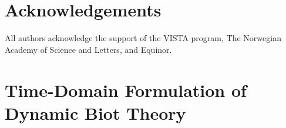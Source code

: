 \documentclass[pdflatex,sn-mathphys-num]{sn-jnl}
\theoremstyle{thmstyleone}%
\theoremstyle{thmstyletwo}%
\theoremstyle{thmstylethree}%
\theoremstyle{definition}
\begin{document}
	
	
	
	
	
	
	
	
	
	
	
	
	
	
	
	
	
	
	
	
	
	
	
	
	
	
	
	
	
	
	
	
	
	
	
	
	
	
	
	
	
	
	
	
	
	
	\section*{Acknowledgements} All authors acknowledge the support of the VISTA program, The Norwegian Academy of Science and Letters, and Equinor. 
	
	
	
	

	

	\appendix
	
	
	\section{Time-Domain Formulation of Dynamic Biot Theory}
	\label{app:time_domain}
	
\end{document}
